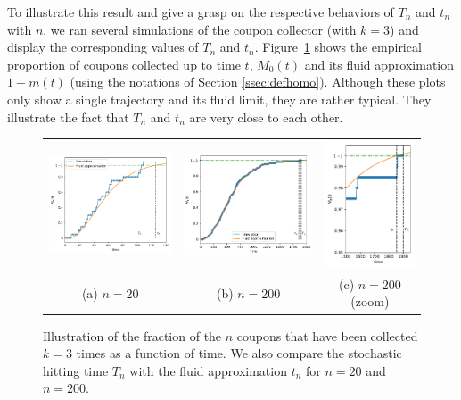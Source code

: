 \documentclass{aptpub}
\begin{document}
To illustrate this result and give a grasp on the respective behaviors
of $T_n$ and $t_n$ with $n$, we ran several simulations of the coupon
collector (with $k=3$) and display the corresponding values of $T_n$
and $t_n$.  Figure~\ref{fig:simu_20-200} shows the empirical
proportion of coupons collected up to time $t$, $M_0(t)$ and its fluid
approximation $1-m(t)$ (using the notations of Section
\ref{ssec:defhomo}).  Although these plots only show a single
trajectory and its fluid limit, they are rather typical.  They
illustrate the fact that $T_n$ and $t_n$ are very close to each other.
\begin{figure}[ht]
  \centering
  \begin{tabular}{@{}c@{}c@{}c}
    \includegraphics[width=.38\linewidth]{simu_20.pdf}
    &\includegraphics[width=0.4\linewidth]{simu_200.pdf}
    &\includegraphics[width=0.22\linewidth]{simu_200_zoom.pdf}\\
    (a) $n=20$ &(b) $n=200$&(c) $n=200$ (zoom)
  \end{tabular}
  \caption{Illustration of the fraction of the $n$ coupons that have
    been collected $k=3$ times as a function of time.  We also compare
    the stochastic hitting time $T_n$ with the fluid approximation
    $t_n$ for $n=20$ and $n=200$. }
  \label{fig:simu_20-200}
\end{figure}
\end{document}
